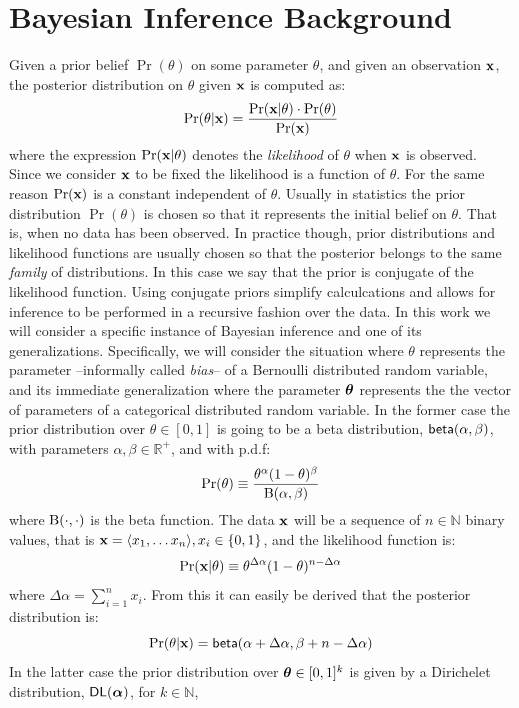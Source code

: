 \documentclass[sigconf, anonymous]{acmart}
\begin{document}
\section{Bayesian Inference Background}
\label{sec_background}
Given a prior belief $\Pr(\theta)$ on some parameter $\theta$,
and given an observation $\textbf{x}$,
the posterior distribution on $\theta$ given $\textbf{x}$ is computed as:
\[
  \Pr(\theta | \textbf{x}) = \frac{\Pr(\textbf{x} | \theta) \cdot \Pr(\theta)}{\Pr(\textbf{x})}
\]
where the expression  $\Pr(\textbf{x} | \theta)$ denotes the \emph{likelihood} of $\theta$ when
$\textbf{x}$ is observed. Since we consider $\textbf{x}$ to be fixed the likelihood is a function of $\theta$.
For the same reason $\Pr(\textbf{x})$ is a constant independent of $\theta$.
Usually in statistics the prior distribution $\Pr(\theta)$ is chosen so that it represents
the initial belief on $\theta$. That is, when no data has been observed. In practice though,
prior distributions and likelihood functions are usually chosen so that the posterior
belongs to the same \emph{family} of distributions. In this case we say that the prior
is conjugate of the likelihood function. Using conjugate priors simplify calculcations and allows
for inference to be performed in a recursive fashion over the data.
In this work we will consider a specific instance of Bayesian inference and one of its generalizations.
Specifically, we will consider the situation where $\theta$ represents the parameter --informally called \emph{bias}--
of a Bernoulli distributed random variable, and its immediate generalization where the parameter $\boldsymbol{\theta}$ represents
the the vector of parameters of a categorical distributed random variable.
In the former case the prior distribution over $\theta\in [0,1]$ is going to be a beta distribution, $\mathsf{beta}(\alpha, \beta)$, with parameters
$\alpha,\beta\in\mathbb{R}^{+}$, and with p.d.f:
\[
  \Pr(\theta)\equiv \frac{\theta^{\alpha} (1- \theta)^{\beta}}{\textup{B}(\alpha,\beta)}
\]
where $\textup{B}(\cdot,\cdot)$ is the beta function.
The data $\textbf{x}$ will be a sequence of $n\in\mathbb{N}$ binary values, that is $\textbf{x}=\langle x_1,\dots x_n \rangle, x_i\in\{0,1\}$, and the likelihood function is:
\[
  \Pr(\textbf{x} | \theta)\equiv \theta^{\Delta \alpha}(1-\theta)^{n - \Delta \alpha}
\]
where $\Delta \alpha = \displaystyle\sum_{i=1}^{n}x_i$.
From this it can easily be derived that the posterior distribution is:
\[
  \Pr(\theta|\textbf{x})=\mathsf{beta}(\alpha + \Delta \alpha,\beta + n - \Delta \alpha)
\]
In the latter case the prior distribution over $\boldsymbol{\theta}\in [0,1]^{k}$ is given by a Dirichelet distribution, $\mathsf{DL}(\boldsymbol{\alpha})$, for $k\in\mathbb{N}$,
\end{document}
